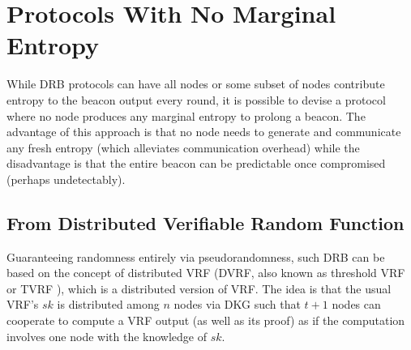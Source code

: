 \documentclass[letterpaper,twocolumn,10pt]{article}
\theoremstyle{definition}
\theoremstyle{remark}
\begin{document}
\section{Protocols With No Marginal Entropy}
\label{section:dvrf}
While DRB protocols can have all nodes or some subset of nodes contribute entropy to the beacon output every round, it is possible to devise a protocol where no node produces any marginal entropy to prolong a beacon. The advantage of this approach is that no node needs to generate and communicate any fresh entropy (which alleviates communication overhead) while the disadvantage is that the entire beacon can be predictable once compromised (perhaps undetectably).

\subsection{From Distributed Verifiable Random Function}
Guaranteeing randomness entirely via pseudorandomness, such DRB can be based on the concept of distributed VRF \cite{hanke2018dfinity,galindo2020fully} (DVRF, also known as threshold VRF or TVRF \cite{cascudomt}), which is a distributed version of VRF. The idea is that the usual VRF's $sk$ is distributed among $n$ nodes via DKG such that $t + 1$ nodes can cooperate to compute a VRF output (as well as its proof) as if the computation involves one node with the knowledge of $sk$.
\end{document}
